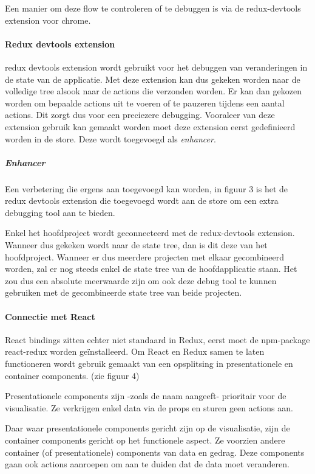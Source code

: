 Een manier om deze flow te controleren of te debuggen is via de redux-devtools extension voor chrome. 

\paragraph{Redux devtools extension}
redux devtools extension wordt gebruikt voor het debuggen van veranderingen in de state van de applicatie. Met deze extension kan dus gekeken worden naar de volledige tree alsook naar de actions die verzonden worden. Er kan dan gekozen worden om bepaalde actions uit te voeren of te pauzeren tijdens een aantal actions. Dit zorgt dus voor een preciezere debugging. Vooraleer van deze extension gebruik kan gemaakt worden moet deze extension eerst gedefinieerd worden in de store. Deze wordt toegevoegd als \textit{enhancer}. 

\subparagraph{Enhancer}
Een verbetering die ergens aan toegevoegd kan worden, in figuur 3 is het de redux devtools extension die toegevoegd wordt aan de store om een extra debugging tool aan te bieden.

Enkel het hoofdproject wordt geconnecteerd met de redux-devtools extension. Wanneer dus gekeken wordt naar de state tree, dan is dit deze van het hoofdproject. Wanneer er dus meerdere projecten met elkaar gecombineerd worden, zal er nog steeds enkel de state tree van de hoofdapplicatie staan. Het zou dus een absolute meerwaarde zijn om ook deze debug tool te kunnen gebruiken met de gecombineerde state tree van beide projecten.
\autocite{devtools}

\paragraph{Connectie met React}
React bindings zitten echter niet standaard in Redux, eerst moet de npm-package react-redux worden geïnstalleerd. Om React en Redux samen te laten functioneren wordt gebruik gemaakt van een opsplitsing in presentationele en container components. (zie figuur 4) 

Presentationele components zijn -zoals de naam aangeeft- prioritair voor de visualisatie. Ze verkrijgen enkel data via de props en sturen geen actions aan. 

Daar waar presentationele components gericht zijn op de visualisatie, zijn de container components gericht op het functionele aspect. Ze voorzien andere container (of presentationele) components van data en gedrag. Deze components gaan ook actions aanroepen om aan te duiden dat de data moet veranderen.  
\autocite{prescon}
\autocite{prescon2}

